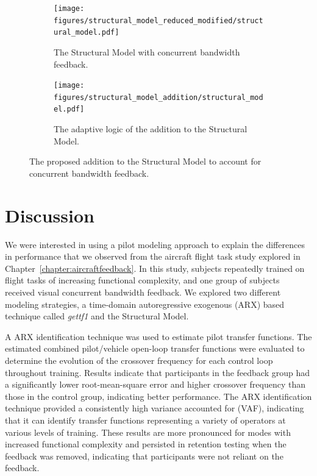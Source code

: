 \begin{figure}[tbp]
    \centering
    \begin{subfigure}{\textwidth}
        \centering
        \texttt{[image: figures/structural\_model\_reduced\_modified/structural\_model.pdf]}
        \caption[The Structural Model with concurrent bandwidth feedback]{The Structural Model with concurrent bandwidth feedback.}
        \label{fig:structuralmodel_feedback}
    \end{subfigure}
    \hfill
    \begin{subfigure}{\textwidth}
        \centering
        \texttt{[image: figures/structural\_model\_addition/structural\_model.pdf]}
        \caption[The adaptive logic of the addition to the Structural Model]{The adaptive logic of the addition to the Structural Model.}
        \label{fig:structuralmodel_feedbackblock}
    \end{subfigure}
    \caption[The proposed addition to the Structural Model to account for concurrent bandwidth feedback]{The proposed addition to the Structural Model to account for concurrent bandwidth feedback.}
\end{figure}

\section{Discussion}
We were interested in using a pilot modeling approach to explain the differences in performance that we observed from the aircraft flight task study explored in Chapter~\ref{chapter:aircraftfeedback}.
In this study, subjects repeatedly trained on flight tasks of increasing functional complexity, and one group of subjects received visual concurrent bandwidth feedback.
We explored two different modeling strategies, a time-domain autoregressive exogenous (ARX) based technique called \textit{gettf1} and the Structural Model.

A ARX identification technique was used to estimate pilot transfer functions.
The estimated combined pilot/vehicle open-loop transfer functions were evaluated to determine the evolution of the crossover frequency for each control loop throughout training.
Results indicate that participants in the feedback group had a significantly lower root-mean-square error and higher crossover frequency than those in the control group, indicating better performance.
The ARX identification technique provided a consistently high variance accounted for (VAF), indicating that it can identify transfer functions representing a variety of operators at various levels of training.
These results are more pronounced for modes with increased functional complexity and persisted in retention testing when the feedback was removed, indicating that participants were not reliant on the feedback.

